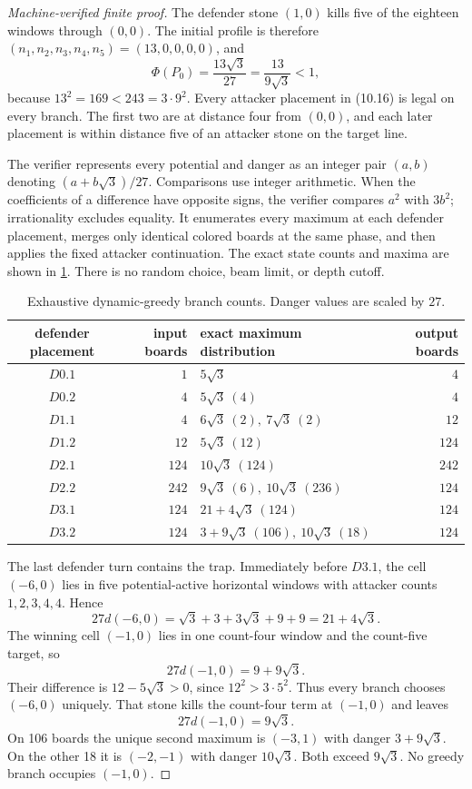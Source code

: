 \begin{proof}[Machine-verified finite proof]
The defender stone $(1,0)$ kills five of the eighteen windows through
$(0,0)$.  The initial profile is therefore
$(n_1,n_2,n_3,n_4,n_5)=(13,0,0,0,0)$, and
\[
 \Phi(P_0)=\frac{13\sqrt3}{27}
           =\frac{13}{9\sqrt3}<1,
\]
because $13^2=169<243=3\cdot9^2$.  Every attacker placement in
\textup{(10.16)} is legal on every branch.  The first two are at distance four
from $(0,0)$, and each later placement is within distance five of an attacker
stone on the target line.

The verifier represents every potential and danger as an integer pair
$(a,b)$ denoting $(a+b\sqrt3)/27$.  Comparisons use integer arithmetic.  When
the coefficients of a difference have opposite signs, the verifier compares
$a^2$ with $3b^2$; irrationality excludes equality.  It enumerates every
maximum at each defender placement, merges only identical colored boards at
the same phase, and then applies the fixed attacker continuation.  The exact
state counts and maxima are shown in \cref{tab:greedy-branches}.  There is no
random choice, beam limit, or depth cutoff.

\begin{table}[tb]
\centering
\caption{Exhaustive dynamic-greedy branch counts.  Danger values are scaled by
$27$.}
\label{tab:greedy-branches}
\begin{tabular}{crlr}
\toprule
defender placement & input boards & exact maximum distribution & output boards\\
\midrule
$D0.1$ & $1$ & $5\sqrt3$ & $4$\\
$D0.2$ & $4$ & $5\sqrt3\ (4)$ & $4$\\
$D1.1$ & $4$ & $6\sqrt3\ (2),\ 7\sqrt3\ (2)$ & $12$\\
$D1.2$ & $12$ & $5\sqrt3\ (12)$ & $124$\\
$D2.1$ & $124$ & $10\sqrt3\ (124)$ & $242$\\
$D2.2$ & $242$ & $9\sqrt3\ (6),\ 10\sqrt3\ (236)$ & $124$\\
$D3.1$ & $124$ & $21+4\sqrt3\ (124)$ & $124$\\
$D3.2$ & $124$ & $3+9\sqrt3\ (106),\ 10\sqrt3\ (18)$ & $124$\\
\bottomrule
\end{tabular}
\end{table}

The last defender turn contains the trap.  Immediately before $D3.1$, the
cell $(-6,0)$ lies in five potential-active horizontal windows with attacker counts
$1,2,3,4,4$.  Hence
\[
 27d(-6,0)=\sqrt3+3+3\sqrt3+9+9=21+4\sqrt3.
\tag{10.17}
\]
The winning cell $(-1,0)$ lies in one count-four window and the count-five
target, so
\[
 27d(-1,0)=9+9\sqrt3.
\tag{10.18}
\]
Their difference is $12-5\sqrt3>0$, since $12^2>3\cdot5^2$.  Thus every
branch chooses $(-6,0)$ uniquely.  That stone kills the count-four term at
$(-1,0)$ and leaves
\[
 27d(-1,0)=9\sqrt3.
\]
On 106 boards the unique second maximum is $(-3,1)$ with danger
$3+9\sqrt3$.  On the other 18 it is $(-2,-1)$ with danger $10\sqrt3$.
Both exceed $9\sqrt3$.  No greedy branch occupies $(-1,0)$.


\end{proof}
